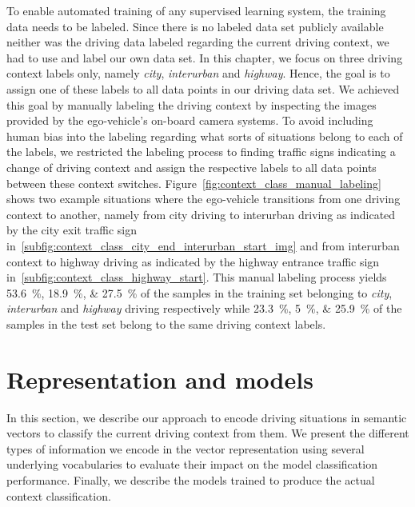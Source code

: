 To enable automated training of any supervised learning system, the training data needs to be labeled. 
Since there is no labeled data set publicly available neither was the driving data labeled regarding the current driving context, we had to use and label our own data set.
In this chapter, we focus on three driving context labels only, namely \emph{city}, \emph{interurban} and \emph{highway}.
Hence, the goal is to assign one of these labels to all data points in our driving data set.
We achieved this goal by manually labeling the driving context by inspecting the images provided by the ego-vehicle's on-board camera systems.
To avoid including human bias into the labeling regarding what sorts of situations belong to each of the labels, we restricted the labeling process to finding traffic signs indicating a change of driving context and assign the respective labels to all data points between these context switches.
Figure~\ref{fig:context_class_manual_labeling} shows two example situations where the ego-vehicle transitions from one driving context to another, namely from city driving to interurban driving as indicated by the city exit traffic sign in~\ref{subfig:context_class_city_end_interurban_start_img} and from interurban context to highway driving as indicated by the highway entrance traffic sign in~\ref{subfig:context_class_highway_start}.
This manual labeling process yields \SIlist{53.6;18.9;27.5}{\percent} of the samples in the training set belonging to \emph{city}, \emph{interurban} and \emph{highway} driving respectively while \SIlist{23.3;5;25.9}{\percent} of the samples in the test set belong to the same driving context labels.

\section{Representation and models}%
\label{sec:representation_and_modelsi_context_classification}

In this section, we describe our approach to encode driving situations in semantic vectors to classify the current driving context from them.
We present the different types of information we encode in the vector representation using several underlying vocabularies to evaluate their impact on the model classification performance.
Finally, we describe the models trained to produce the actual context classification.

